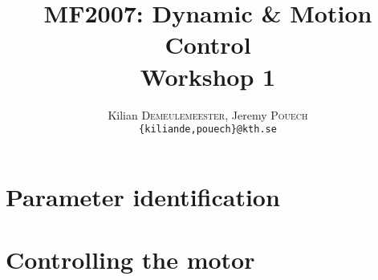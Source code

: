 \documentclass[a4paper,10pt,twocolumn]{article}
\title{MF2007: Dynamic \& Motion Control \\ Workshop 1}
\author{Kilian \textsc{Demeulemeester}, Jeremy \textsc{Pouech} \\ \texttt{\{kiliande,pouech\}@kth.se}}
\begin{document}
\setlength\parindent{0em}

\maketitle

\tableofcontents

\begin{abstract}
 
\end{abstract}
  

\part*{Parameter identification} 

	

\clearpage

\part*{Controlling the motor}




\clearpage
\end{document}
